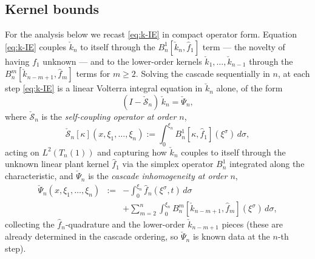 \documentclass[journal,twoside,web]{ieeecolor}
\begin{document}
\subsection{Kernel bounds}\label{sec:kernel-bounds}

For the analysis below we recast \eqref{eq:k-IE} in compact operator form. Equation \eqref{eq:k-IE} couples $\check k_n$ to itself through the $B^1_n[\check k_n,\hat f_1]$ term --- the novelty of having $f_1$ unknown --- and to the lower-order kernels $\check k_1,\ldots,\check k_{n-1}$ through the $B^m_n[\check k_{n-m+1},\hat f_m]$ terms for $m\ge 2$. Solving the cascade sequentially in $n$, at each step \eqref{eq:k-IE} is a linear Volterra integral equation in $\check k_n$ alone, of the form
\begin{equation}\label{eq:k-IE-compact}
(I-\check{\mathcal S}_n)\,\check k_n=\check\Psi_n,
\end{equation}
where $\check{\mathcal S}_n$ is the \emph{self-coupling operator at order $n$},
\begin{equation}\label{eq:Sn-def}
\check{\mathcal S}_n[\kappa](x,\xi_1,\ldots,\xi_n):=\int_0^{\xi_n}B^1_n[\kappa,\hat f_1](\xi^\sigma)\,d\sigma,
\end{equation}
acting on $L^2(T_n(1))$ and capturing how $\check k_n$ couples to itself through the unknown linear plant kernel $\hat f_1$ via the simplex operator $B^1_n$ integrated along the characteristic, and $\check\Psi_n$ is the \emph{cascade inhomogeneity at order $n$},
\begin{eqnarray}
\check\Psi_n(x,\xi_1,\ldots,\xi_n) &:=& -\int_0^{\xi_n}\!\hat f_n(\xi^\sigma,t)\,d\sigma \nonumber\\
&& +\sum_{m=2}^n\int_0^{\xi_n}B^m_n[\check k_{n-m+1},\hat f_m](\xi^\sigma)\,d\sigma, \label{eq:Psin-def}
\end{eqnarray}
collecting the $\hat f_n$-quadrature and the lower-order $\check k_{n-m+1}$ pieces (these are already determined in the cascade ordering, so $\check\Psi_n$ is known data at the $n$-th step).
\end{document}
